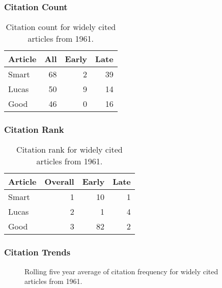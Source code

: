 \documentclass[
  10pt,
  letterpaper,
  DIV=11,
  numbers=noendperiod,
  twoside]{scrartcl}
\begin{document}
\subsubsection*{Citation Count}\label{sec-count-1961}

\begin{longtable}[]{@{}lrrr@{}}

\caption{\label{tbl-citation-count-1961}Citation count for widely cited
articles from 1961.}

\tabularnewline

\toprule\noalign{}
Article & All & Early & Late \\
\midrule\noalign{}
\endhead
\bottomrule\noalign{}
\endlastfoot
Smart & 68 & 2 & 39 \\
Lucas & 50 & 9 & 14 \\
Good & 46 & 0 & 16 \\

\end{longtable}

\subsubsection*{Citation Rank}\label{sec-rank-1961}

\begin{longtable}[]{@{}lrrr@{}}

\caption{\label{tbl-citation-rank-1961}Citation rank for widely cited
articles from 1961.}

\tabularnewline

\toprule\noalign{}
Article & Overall & Early & Late \\
\midrule\noalign{}
\endhead
\bottomrule\noalign{}
\endlastfoot
Smart & 1 & 10 & 1 \\
Lucas & 2 & 1 & 4 \\
Good & 3 & 82 & 2 \\

\end{longtable}

\subsubsection*{Citation Trends}\label{sec-trends-1961}

\begin{figure}


\caption{\label{fig-citation-spaghetti-1961}Rolling five year average of
citation frequency for widely cited articles from 1961.}

\end{figure}%
\end{document}
